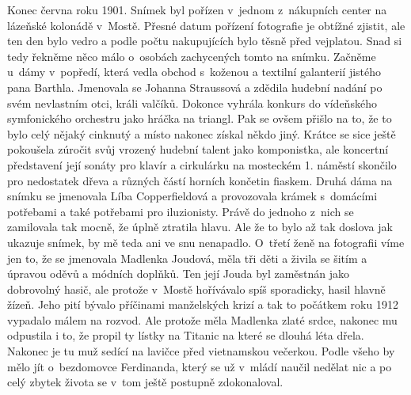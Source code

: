 
Konec června roku 1901. Snímek byl pořízen v~jednom z~nákupních center
na lázeňské kolonádě v~Mostě. Přesné datum pořízení fotografie je
obtížné zjistit, ale ten den bylo vedro a podle počtu nakupujících
bylo těsně před vejplatou. Snad si tedy řekněme něco málo o~osobách
zachycených tomto na snímku. Začněme u~dámy v~popředí, která vedla
obchod s~koženou a textilní galanterií jistého pana Barthla. Jmenovala
se Johanna Straussová a zdědila hudební nadání po svém nevlastním
otci, králi valčíků. Dokonce vyhrála konkurs do vídeňského
symfonického orchestru jako hráčka na triangl. Pak se ovšem přišlo na
to, že to bylo celý nějaký cinknutý a místo nakonec získal někdo jiný.
Krátce se sice ještě pokoušela zúročit svůj vrozený hudební talent
jako komponistka, ale koncertní představení její sonáty pro klavír a
cirkulárku na mosteckém 1. náměstí skončilo pro nedostatek dřeva a
různých částí horních končetin fiaskem. Druhá dáma na snímku se
jmenovala Líba Copperfieldová a provozovala krámek s~domácími
potřebami a také potřebami pro iluzionisty. Právě do jednoho z~nich se
zamilovala tak mocně, že úplně ztratila hlavu. Ale že to bylo až tak
doslova jak ukazuje snímek, by mě teda ani ve snu nenapadlo. O~třetí
ženě na fotografii víme jen to, že se jmenovala Madlenka Joudová, měla
tři děti a živila se šitím a úpravou oděvů a módních doplňků. Ten její
Jouda byl zaměstnán jako dobrovolný hasič, ale protože v~Mostě
hořívávalo spíš sporadicky, hasil hlavně žízeň. Jeho pití bývalo
příčinami manželských krizí a tak to počátkem roku 1912 vypadalo málem
na rozvod. Ale protože měla Madlenka zlaté srdce, nakonec mu odpustila
i to, že propil ty lístky na Titanic na které se dlouhá léta dřela.
Nakonec je tu muž sedící na lavičce před vietnamskou večerkou. Podle
všeho by mělo jít o~bezdomovce Ferdinanda, který se už v~mládí naučil
nedělat nic a po celý zbytek života se v~tom ještě postupně
zdokonaloval.

